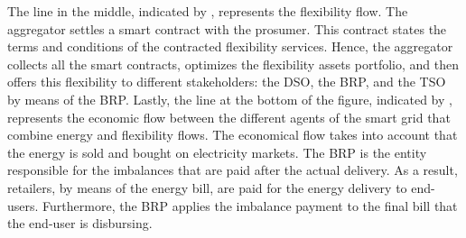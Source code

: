 The line in the middle, indicated by , represents the flexibility flow. The aggregator settles a smart contract with the prosumer. This contract states the terms and conditions of the contracted flexibility services. Hence, the aggregator collects all the smart contracts, optimizes the flexibility assets portfolio, and then offers this flexibility to different stakeholders: the DSO, the BRP, and the TSO by means of the BRP. 
Lastly, the line at the bottom of the figure, indicated by , represents the economic flow between the different agents of the smart grid that combine energy and flexibility flows. The economical flow takes into account that the energy is sold and bought on electricity markets. The BRP is the entity responsible for the imbalances that are paid after the actual delivery. As a result, retailers, by means of the energy bill, are paid for the energy delivery to end-users. Furthermore, the BRP applies the imbalance payment to the final bill that the end-user is disbursing.

